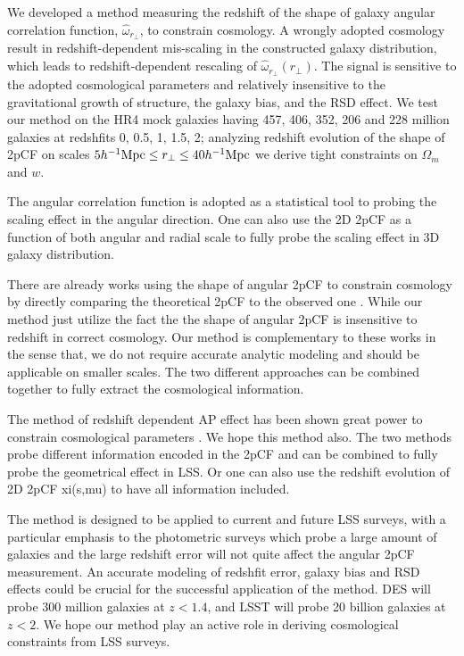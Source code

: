 \documentclass[iop]{emulateapj}
\begin{document}
We developed a method measuring the redshift of the shape of galaxy angular correlation function, $\hat \omega_{r_\perp}$, to constrain cosmology.
A wrongly adopted cosmology result in redshift-dependent mis-scaling in the constructed galaxy distribution,
which leads to redshift-dependent rescaling of $\hat \omega_{r_\perp}(r_\perp)$.
The signal is sensitive to the adopted cosmological parameters and relatively insensitive to the gravitational growth of structure,
the galaxy bias, and the RSD effect.
We test our method on the HR4 mock galaxies having 457, 406, 352, 206 and 228 million galaxies at redshfits 0, 0.5, 1, 1.5, 2;
analyzing redshift evolution of the shape of 2pCF on scales $5  h^{-1} {\rm Mpc} \leq r_\perp \leq 40 h^{-1} {\rm Mpc}$ we derive tight constraints on $\Omega_m$ and $w$.

 

The angular correlation function is adopted as a statistical tool to probing the scaling effect in the angular direction.
One can also use the 2D 2pCF as a function of both angular and radial scale to fully probe the scaling effect in 3D galaxy distribution.

 

There are already works using the shape of angular 2pCF to constrain cosmology
by directly comparing the theoretical 2pCF to the observed one \citep{Salvador2014,Salvador2016}.
While our method just utilize the fact the the shape of angular 2pCF is insensitive to redshift in correct cosmology.
Our method is complementary to these works in the sense that,
we do not require accurate analytic modeling and should be applicable on smaller scales.
The two different approaches can be combined together to fully extract the cosmological information.

 

The method of redshift dependent AP effect has been shown great power to constrain cosmological parameters \cite{Li2014,Li2015,Li2015}.
We hope this method also.
The two methods probe different information encoded in the 2pCF and can be combined to fully probe the geometrical effect in LSS.
Or one can also use the redshift evolution of 2D 2pCF xi(s,mu) to have all information included.

 

The method is designed to be applied to current and future LSS surveys,
with a particular emphasis to the photometric surveys which probe a large amount of galaxies and the large redshift error will not quite affect the angular 2pCF measurement.
An accurate modeling of redshfit error, galaxy bias and RSD effects could be crucial for the successful application of the method.
DES will probe 300 million galaxies at $z<1.4$, and LSST will probe 20 billion galaxies at $z<2$.
We hope our method play an active role in  deriving cosmological constraints from LSS surveys.
\end{document}

